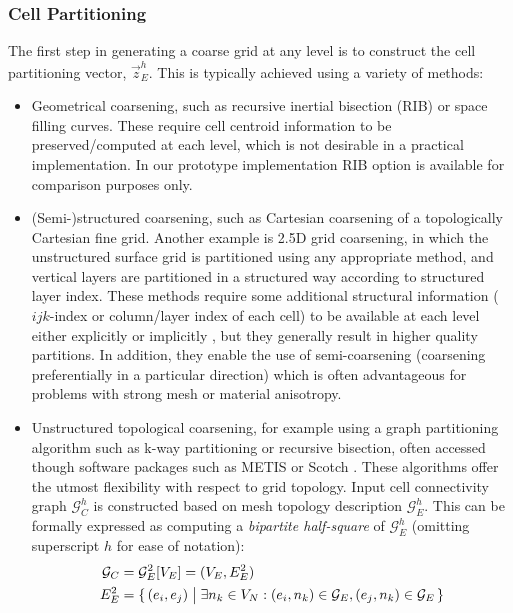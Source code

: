 \subsubsection{Cell Partitioning}

The first step in generating a coarse grid at any level is to construct the cell partitioning vector, $\vec{z}_E^h$.   This is typically achieved using a variety of methods:
\begin{itemize}
    \item Geometrical coarsening, such as recursive inertial bisection (RIB) or space filling curves. These require cell centroid information to be preserved/computed at each level, which is not desirable in a practical implementation.   In our prototype implementation RIB option is available for comparison purposes only.
    \item (Semi-)structured coarsening, such as Cartesian coarsening of a topologically Cartesian fine grid.   Another example is 2.5D grid coarsening, in which the unstructured surface grid is partitioned using any appropriate method, and vertical layers are partitioned in a structured way according to structured layer index.   These methods require some additional structural information ($ijk$-index or column/layer index of each cell) to be available at each level either explicitly or implicitly , but they generally result in higher quality partitions.   In addition, they enable the use of semi-coarsening (coarsening preferentially in a particular direction) which is often advantageous for problems with strong mesh or material anisotropy.
    \item Unstructured topological coarsening, for example using a graph partitioning algorithm such as k-way partitioning or recursive bisection, often accessed though software packages such as METIS \cite{Karypis1999} or Scotch \cite{Chevalier2008}.   These algorithms offer the utmost flexibility with respect to grid topology.   Input cell connectivity graph $\mathcal{G}_C^h$ is constructed based on mesh topology description $\mathcal{G}_E^h$.   This can be formally expressed as computing a \textit{bipartite half-square} of $\mathcal{G}_E^h$ (omitting superscript $h$ for ease of notation):
    \begin{align}
        \mathcal{G}_C &= \mathcal{G}_E^2[V_E] = (V_E,E_E^2) \label{eq:graph_square}\\
        E_E^2 &= \set{(e_i,e_j) \bigm| \exists n_k \in V_N: (e_i,n_k) \in \mathcal{G}_E, (e_j,n_k) \in \mathcal{G}_E} \label{eq:graph_square_edges}
    \end{align}

\end{itemize}
